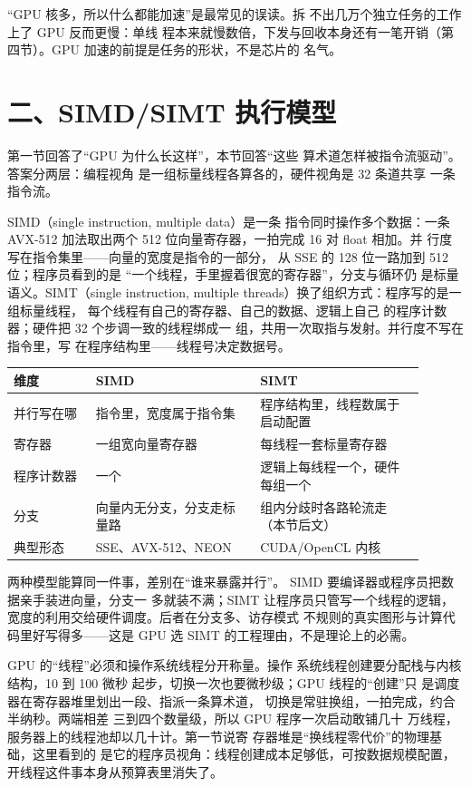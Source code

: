 \begin{warningbox}
“GPU 核多，所以什么都能加速”是最常见的误读。拆
不出几万个独立任务的工作上了 GPU 反而更慢：单线
程本来就慢数倍，下发与回收本身还有一笔开销（第
四节）。GPU 加速的前提是任务的形状，不是芯片的
名气。
\end{warningbox}

\section{二、SIMD/SIMT 执行模型}

第一节回答了“GPU 为什么长这样”，本节回答“这些
算术道怎样被指令流驱动”。答案分两层：编程视角
是一组标量线程各算各的，硬件视角是 32 条道共享
一条指令流。

SIMD（single instruction, multiple data）是一条
指令同时操作多个数据：一条 AVX-512 加法取出两个
512 位向量寄存器，一拍完成 16 对 float 相加。并
行度写在指令集里——向量的宽度是指令的一部分，
从 SSE 的 128 位一路加到 512 位；程序员看到的是
“一个线程，手里握着很宽的寄存器”，分支与循环仍
是标量语义。SIMT（single instruction, multiple
threads）换了组织方式：程序写的是一组标量线程，
每个线程有自己的寄存器、自己的数据、逻辑上自己
的程序计数器；硬件把 32 个步调一致的线程绑成一
组，共用一次取指与发射。并行度不写在指令里，写
在程序结构里——线程号决定数据号。

\begin{longtable}{L{0.18\linewidth}L{0.36\linewidth}L{0.36\linewidth}}
\toprule
维度 & SIMD & SIMT \\
\midrule
并行写在哪 & 指令里，宽度属于指令集 & 程序结构里，线程数属于启动配置 \\\tablerowrule
寄存器 & 一组宽向量寄存器 & 每线程一套标量寄存器 \\\tablerowrule
程序计数器 & 一个 & 逻辑上每线程一个，硬件每组一个 \\\tablerowrule
分支 & 向量内无分支，分支走标量路 & 组内分歧时各路轮流走（本节后文） \\\tablerowrule
典型形态 & SSE、AVX-512、NEON & CUDA/OpenCL 内核 \\
\bottomrule
\end{longtable}

两种模型能算同一件事，差别在“谁来暴露并行”。
SIMD 要编译器或程序员把数据亲手装进向量，分支一
多就装不满；SIMT 让程序员只管写一个线程的逻辑，
宽度的利用交给硬件调度。后者在分支多、访存模式
不规则的真实图形与计算代码里好写得多——这是
GPU 选 SIMT 的工程理由，不是理论上的必需。

GPU 的“线程”必须和操作系统线程分开称量。操作
系统线程创建要分配栈与内核结构，10 到 100 微秒
起步，切换一次也要微秒级；GPU 线程的“创建”只
是调度器在寄存器堆里划出一段、指派一条算术道，
切换是常驻换组，一拍完成，约合半纳秒。两端相差
三到四个数量级，所以 GPU 程序一次启动敢铺几十
万线程，服务器上的线程池却以几十计。第一节说寄
存器堆是“换线程零代价”的物理基础，这里看到的
是它的程序员视角：线程创建成本足够低，可按数据规模配置，
开线程这件事本身从预算表里消失了。

